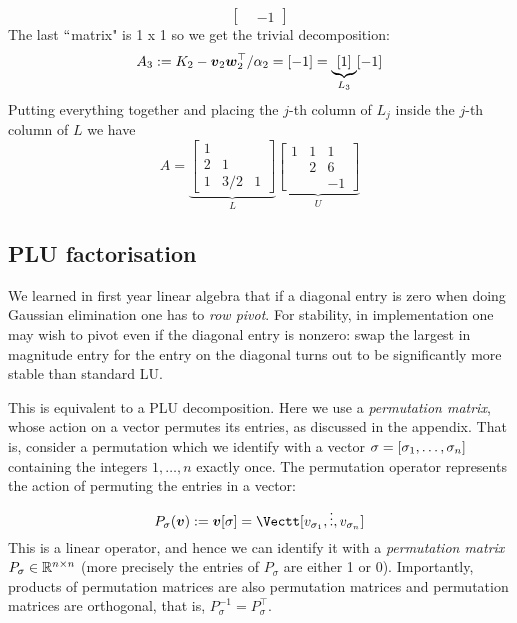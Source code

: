 \begin{example}[LU by-hand]
\[\begin{bmatrix}
            & -1 \end{bmatrix}
\]
The last \ensuremath{\ldq}matrix" is 1 x 1 so we get the trivial decomposition:
\[
A_3 := K_2 - \bm{{\mbox{\boldmath$v$\unboldmath}}}_2 \bm{{\mbox{\boldmath$w$\unboldmath}}}_2^\top /\alpha_2 =  [-1] = \underbrace{[1]}_{L_3} [-1]
\]
Putting everything together and placing the $j$-th column of $L_j$ inside the $j$-th column of $L$ we have
\[
A = \underbrace{\begin{bmatrix} 1  \\
                    2 & 1 &  \\
                    1 & 3/2 & 1
                    \end{bmatrix}}_{L} \underbrace{\begin{bmatrix} 1 & 1 & 1 \\
                     & 2 & 6 \\
                     &  & -1
                    \end{bmatrix}}_U
\]
\end{example}

\subsection{PLU factorisation}
We learned in first year linear algebra that if a diagonal entry is zero when doing Gaussian elimination one has to \emph{row pivot}. For stability, in implementation one may wish to pivot even if the diagonal entry is nonzero: swap the largest in magnitude entry for the entry on the diagonal turns out to be significantly more stable than standard LU.

This is equivalent to a PLU decomposition. Here we use a \emph{permutation matrix}, whose action on a vector permutes its entries, as discussed in the appendix. That is, consider a permutation which we identify with a vector ${\mathbf \ensuremath{\sigma}} = [\ensuremath{\sigma}_1,\ensuremath{\ldots},\ensuremath{\sigma}_n]$ containing the integers $1,\ensuremath{\ldots},n$ exactly once. The permutation operator represents the action of permuting the entries in a vector:
\[
P_\ensuremath{\sigma}(\ensuremath{\bm{\v}}) := \ensuremath{\bm{\v}}[{\mathbf \ensuremath{\sigma}}] = \Vectt[v_{\ensuremath{\sigma}_1},\ensuremath{\vdots},v_{\ensuremath{\sigma}_n}]
\]
This is a linear operator, and hence we can identify it with a \emph{permutation matrix} $P_\sigma \in {\mathbb R}^{n \times n}$ (more precisely the entries  of $P_\ensuremath{\sigma}$ are either 1 or 0). Importantly, products of permutation matrices are also permutation matrices and permutation matrices are orthogonal, that is, $P_\ensuremath{\sigma}^{-1} = P_\ensuremath{\sigma}^\top$.

